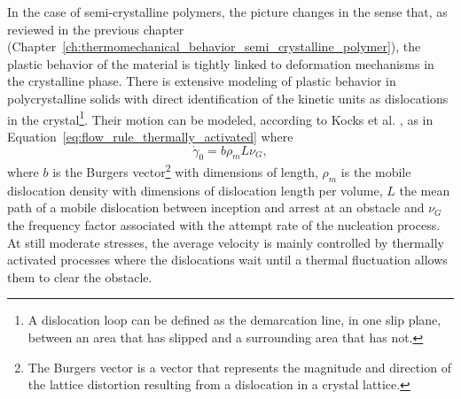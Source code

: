 In the case of semi-crystalline polymers, the picture changes in the sense that, as reviewed in the previous chapter (Chapter~\ref{ch:thermomechanical_behavior_semi_crystalline_polymer}), the plastic behavior of the material is tightly linked to deformation mechanisms in the crystalline phase.
There is extensive modeling of plastic behavior in polycrystalline solids with direct identification of the kinetic units as dislocations in the crystal\footnote{A dislocation loop can be defined as the demarcation line, in one slip plane, between an area that has slipped and a surrounding area that has not.}.
Their motion can be modeled, according to Kocks et al. \citep{kocks1975thermodynamics}, as in Equation~\eqref{eq:flow_rule_thermally_activated} where
\begin{equation}
	\label{eq:pre_exponential_def}
	\dot \gamma_0 = b\rho_m L \nu_G,
\end{equation}
where $b$ is the Burgers vector\footnote{The Burgers vector is a vector that represents the magnitude and direction of the lattice distortion resulting from a dislocation in a crystal lattice.} with dimensions of length, $\rho_m$ is the mobile dislocation density with dimensions of dislocation length per volume, $L$ the mean path of a mobile dislocation between inception and arrest at an obstacle and $\nu_G$ the frequency factor associated with the attempt rate of the nucleation process.
At still moderate stresses, the average velocity is mainly controlled by thermally activated processes where the dislocations wait until a thermal fluctuation allows them to clear the obstacle.

